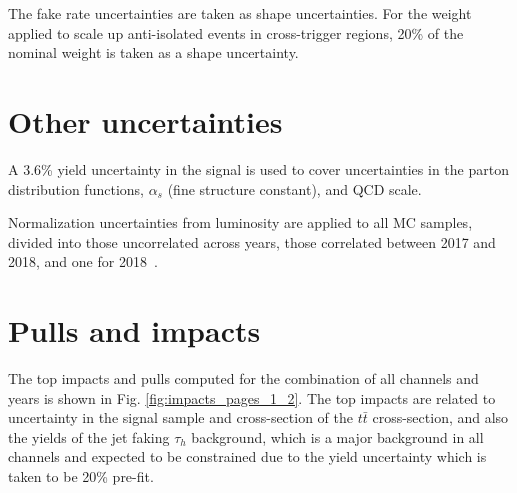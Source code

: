 The fake rate uncertainties are taken as shape uncertainties. For the weight applied to scale up anti-isolated events in cross-trigger regions, 20\% of the nominal weight is taken as a shape uncertainty.

\section{Other uncertainties}
\label{section:uncertainties_others}
A 3.6\% yield uncertainty in the signal is used to cover uncertainties in the parton distribution functions, $\alpha_s$ (fine structure constant), and QCD scale. 

Normalization uncertainties from luminosity are applied to all MC samples, divided into those uncorrelated across years, those correlated between 2017 and 2018, and one for 2018~\cite{twiki_LUMI_POG_recommendation}.

\section{Pulls and impacts}
\label{section:pulls_and_impacts}
The top impacts and pulls computed for the combination of all channels and years is shown in Fig. \ref{fig:impacts_pages_1_2}. The top impacts are related to uncertainty in the signal sample and cross-section of the $t\bar{t}$ cross-section, and also the yields of the jet faking $\tau_{h}$ background, which is a major background in all channels and expected to be constrained due to the yield uncertainty which is taken to be 20\% pre-fit. 

